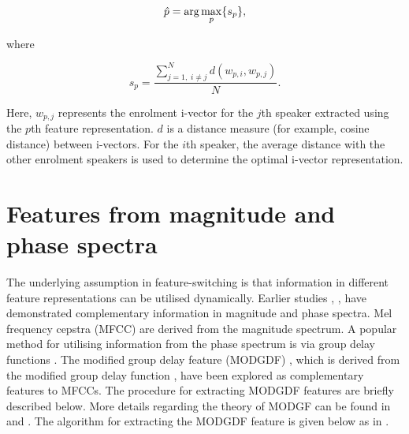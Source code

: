 \documentclass{article}
\begin{document}
\begin{equation}
\Hat{p} = \arg\max_p \{s_p\},
\label{eq:opt_ivec}
\end{equation}

where 

\begin{equation}
s_p = \frac{\displaystyle \sum_{j=1, \; i \neq j}^N d(w_{p,i},w_{p,j})}{N}.
\label{eq:sp}
\end{equation}

Here, $w_{p,j}$ represents the enrolment i-vector for the $j$th speaker
extracted using the $p$th feature representation. $d$ is a distance measure (for
example, cosine distance) between i-vectors. For the $i$th speaker, the average
distance with the other enrolment speakers is used to determine the optimal
i-vector representation. 

\section{Features from magnitude and phase spectra}
\label{sec:featExt}

The underlying assumption in feature-switching is that information in different
feature representations can be utilised dynamically. Earlier studies \cite{complement1},
\cite{complement2}, \cite{mgd_complement} have demonstrated complementary information in
magnitude and phase spectra. Mel frequency cepstra (MFCC) are derived from the magnitude
spectrum. A popular method for utilising information from the phase spectrum is
via group delay functions \cite{group_delay}. The modified group delay feature (MODGDF) 
\cite{modgd_feat}, which is derived from the modified group delay function
\cite{modgd_func}, have been explored as complementary features to MFCCs. The procedure for
extracting MODGDF features are briefly described below. More details regarding the theory
of MODGF can be found in \cite{modgd_func} and \cite{modgd_feat}. The algorithm for extracting the MODGDF feature is given below as in \cite{hegdeModgdf}.
\end{document}
